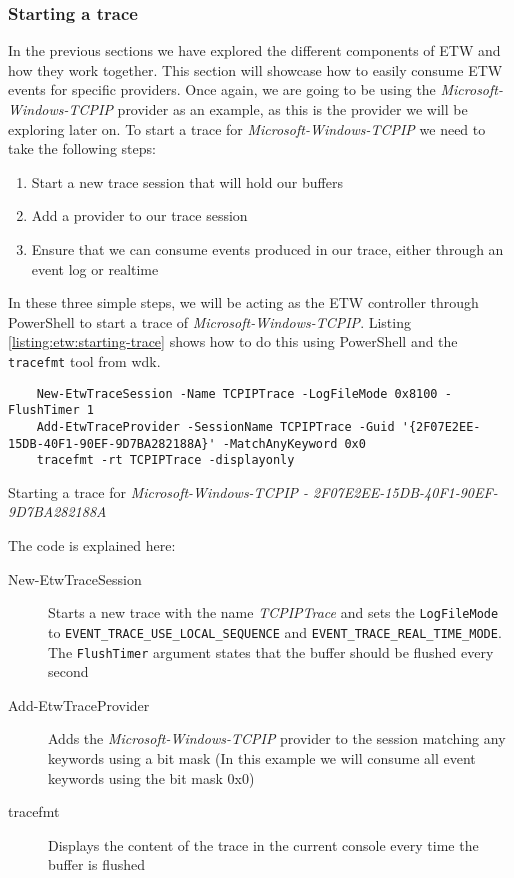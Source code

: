 \documentclass{report}
\begin{document}
\subsubsection{Starting a trace}
In the previous sections we have explored the different components of \gls{ETW} and how they work together. This section will showcase how to easily consume \gls{ETW} events for specific providers. Once again, we are going to be using the \emph{Microsoft-Windows-TCPIP} provider as an example, as this is the provider we will be exploring later on. To start a trace for \emph{Microsoft-Windows-TCPIP} we need to take the following steps:

\begin{enumerate}
    \item Start a new trace session that will hold our buffers
    \item Add a provider to our trace session
    \item Ensure that we can consume events produced in our trace, either through an event log or realtime
\end{enumerate}

In these three simple steps, we will be acting as the \gls{ETW} controller through PowerShell to start a trace of \emph{Microsoft-Windows-TCPIP}. Listing \ref{listing:etw:starting-trace} shows how to do this using PowerShell and the \texttt{tracefmt} tool from \gls{wdk}.

\begin{listing}
\begin{verbatim}
    New-EtwTraceSession -Name TCPIPTrace -LogFileMode 0x8100 -FlushTimer 1
    Add-EtwTraceProvider -SessionName TCPIPTrace -Guid '{2F07E2EE-15DB-40F1-90EF-9D7BA282188A}' -MatchAnyKeyword 0x0
    tracefmt -rt TCPIPTrace -displayonly
\end{verbatim}
\caption{Starting a trace for \emph{Microsoft-Windows-TCPIP - 2F07E2EE-15DB-40F1-90EF-9D7BA282188A}}
\label{listing:etw:starting-trace}
\end{listing}

The code is explained here:
\begin{description}
    \item[New-EtwTraceSession] Starts a new trace with the name \emph{TCPIPTrace} and sets the \texttt{LogFileMode} to \texttt{EVENT_TRACE_USE_LOCAL_SEQUENCE} and \texttt{EVENT_TRACE_REAL_TIME_MODE}\cite{url:etw:trace:logging-mode-constants}. The \texttt{FlushTimer} argument states that the buffer should be flushed every second
    \item[Add-EtwTraceProvider] Adds the \emph{Microsoft-Windows-TCPIP} provider to the session matching any keywords using a bit mask (In this example we will consume all event keywords using the bit mask 0x0)
    \item[tracefmt] Displays the content of the trace in the current console every time the buffer is flushed
\end{description}
\end{document}
